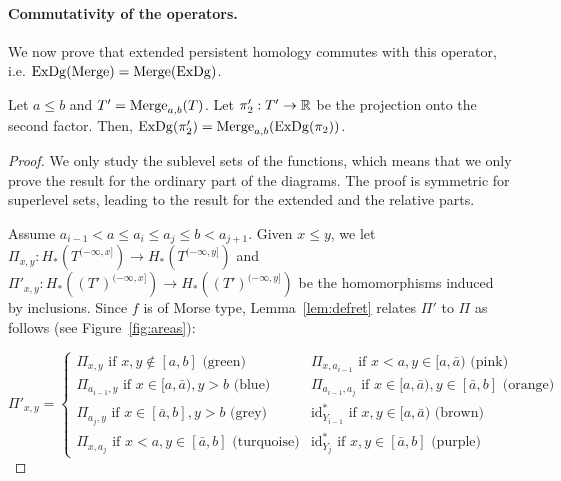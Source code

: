 \paragraph*{Commutativity of the operators.} We now prove %
that extended persistent homology commutes with this operator, i.e. $\mathrm{ExDg}(\mathrm{Merge})=\mathrm{Merge}(\mathrm{ExDg})$.

\begin{lem}
\label{lem:mergeprop}
Let $a\leq b$ and $T'=\mathrm{Merge}_{a,b}(T)$. 
Let $\pi_2':T'\rightarrow\mathbb{R}$ be the projection onto the second factor. Then, $\mathrm{ExDg}(\pi_2')=\mathrm{Merge}_{a,b}(\mathrm{ExDg}(\pi_2))$.
\end{lem}

\begin{proof}
We only study the sublevel sets of the functions, which means that we
only prove the result for the ordinary part of the diagrams.  The
proof is symmetric for superlevel sets, leading to the result for
the extended and the relative parts. %

Assume $a_{i-1}<a\leq a_i\leq a_j\leq b<a_{j+1}$.  Given $x\leq y$, we
let $\Pi_{x,y}:H_*\left(T^{(-\infty,x]}\right)\rightarrow
      H_*\left(T^{(-\infty,y]}\right)$ and
    $\Pi'_{x,y}:H_*\left((T')^{(-\infty,x]}\right)\rightarrow
  H_*\left((T')^{(-\infty,y]}\right)$ be the homomorphisms induced by
inclusions.  Since $f$ is of Morse type, Lemma~\ref{lem:defret}
relates $\Pi'$ to $\Pi$ as follows (see Figure~\ref{fig:areas}):

\begin{equation}\label{eq:rel}
\Pi'_{x,y}=\left\{ \begin{array}{ll} \Pi_{x,y}\text{ if }x,y\notin[a,b]\text{ (green)} & \Pi_{x,a_{i-1}}\text{ if }x<a,y\in[a,\bar{a})\text{ (pink)} \\
					   \Pi_{a_{i-1},y}\text{ if }x\in[a,\bar{a}),y>b\text{ (blue)} & \Pi_{a_{i-1},a_j}\text{ if }x\in[a,\bar{a}),y\in[\bar{a},b]\text{ (orange)}\\
					   \Pi_{a_j,y}\text{ if }x\in[\bar{a},b],y>b\text{ (grey)} & \text{id}^*_{Y_{i-1}}\text{ if }x,y\in[a,\bar{a})\text{ (brown)} \\
					   \Pi_{x,a_j}\text{ if }x<a,y\in[\bar{a},b]\text{ (turquoise)} & \text{id}^*_{Y_j}\text{ if }x,y\in[\bar{a},b]\text{ (purple)} 
		\end{array} \right.
\end{equation}


\end{proof}
